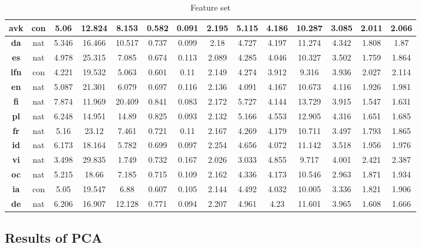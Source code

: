 \documentclass[12pt,a4paper]{article}
\numberwithin{figure}{section}
\numberwithin{table}{section}
\numberwithin{definition}{section}
\begin{document}
\begin{table}
\begin{tabular}{|c|c|c|c|c|c|c|c|c|c|c|c|c|c|}
          \textbf{avk} & con & 5.06 & 12.824 & 8.153 & 0.582 & 0.091 & 2.195 & 5.115 & 4.186 & 10.287 & 3.085 & 2.011 & 2.066 \\ \hline
          \textbf{da} & nat & 5.346 & 16.466 & 10.517 & 0.737 & 0.099 & 2.18 & 4.727 & 4.197 & 11.274 & 4.342 & 1.808 & 1.87 \\ \hline
          \textbf{es} & nat & 4.978 & 25.315 & 7.085 & 0.674 & 0.113 & 2.089 & 4.285 & 4.046 & 10.327 & 3.502 & 1.759 & 1.864 \\ \hline
          \textbf{lfn} & con & 4.221 & 19.532 & 5.063 & 0.601 & 0.11 & 2.149 & 4.274 & 3.912 & 9.316 & 3.936 & 2.027 & 2.114 \\ \hline
          \textbf{en} & nat & 5.087 & 21.301 & 6.079 & 0.697 & 0.116 & 2.136 & 4.091 & 4.167 & 10.673 & 4.116 & 1.926 & 1.981 \\ \hline
          \textbf{fi} & nat & 7.874 & 11.969 & 20.409 & 0.841 & 0.083 & 2.172 & 5.727 & 4.144 & 13.729 & 3.915 & 1.547 & 1.631 \\ \hline
          \textbf{pl} & nat & 6.248 & 14.951 & 14.89 & 0.825 & 0.093 & 2.132 & 5.166 & 4.553 & 12.905 & 4.316 & 1.651 & 1.685 \\ \hline
          \textbf{fr} & nat & 5.16 & 23.12 & 7.461 & 0.721 & 0.11 & 2.167 & 4.269 & 4.179 & 10.711 & 3.497 & 1.793 & 1.865 \\ \hline
          \textbf{id} & nat & 6.173 & 18.164 & 5.782 & 0.699 & 0.097 & 2.254 & 4.656 & 4.072 & 11.142 & 3.518 & 1.956 & 1.976 \\ \hline
          \textbf{vi} & nat & 3.498 & 29.835 & 1.749 & 0.732 & 0.167 & 2.026 & 3.033 & 4.855 & 9.717 & 4.001 & 2.421 & 2.387 \\ \hline
          \textbf{oc} & nat & 5.215 & 18.66 & 7.185 & 0.715 & 0.109 & 2.162 & 4.336 & 4.173 & 10.546 & 2.963 & 1.871 & 1.934 \\ \hline
          \textbf{ia} & con & 5.05 & 19.547 & 6.88 & 0.607 & 0.105 & 2.144 & 4.492 & 4.032 & 10.005 & 3.336 & 1.821 & 1.906 \\ \hline
          \textbf{de} & nat & 6.206 & 16.907 & 12.128 & 0.771 & 0.094 & 2.207 & 4.961 & 4.23 & 11.601 & 3.965 & 1.608 & 1.666 \\ \hline       
  \end{tabular}
  \caption{Feature set}
  \label{tbl:featurestable}
\end{table}

\subsection{Results of PCA}
\label{ssec:pcaresults}
\end{document}
